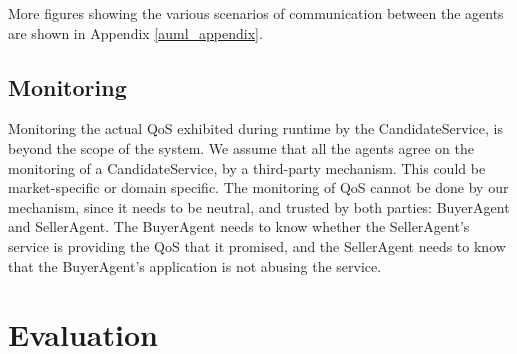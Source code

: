 \documentclass[10pt,journal,compsoc]{IEEEtran}
\begin{document}
More figures showing the various scenarios of communication between the agents are shown in Appendix \autoref{auml_appendix}.
\subsection{Monitoring}
Monitoring the actual QoS exhibited during runtime by the CandidateService, is beyond the scope of the system. We assume that all the agents agree on the monitoring of a CandidateService, by a third-party mechanism. This could be market-specific or domain specific. The monitoring of QoS cannot be done by our mechanism, since it needs to be neutral, and trusted by both parties: BuyerAgent and SellerAgent. The BuyerAgent needs to know whether the SellerAgent's service is providing the QoS that it promised, and the SellerAgent needs to know that the BuyerAgent's application is not abusing the service.


\section{Evaluation}
\end{document}

